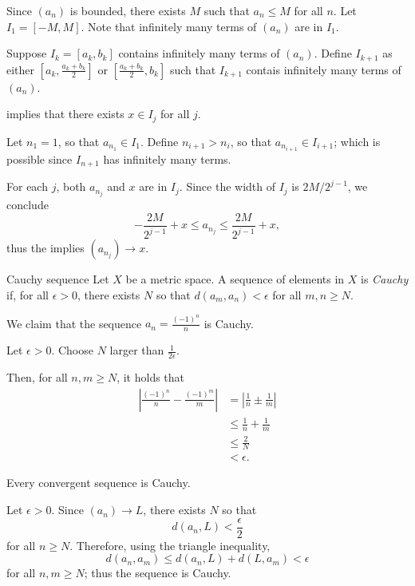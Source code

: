 \begin{dem}{}{}
	Since \((a_n)\) is bounded, there exists \(M\) such that \(a_n \leq M\) for all \(n\). Let \(I_1 = [-M, M]\). Note that infinitely many terms of \((a_n)\) are in \(I_1\).

	Suppose \(I_k = [a_k, b_k]\) contains infinitely many terms of \((a_n)\). Define \(I_{k+1}\) as either \([a_k, \frac{a_k + b_k}{2}]\) or  \([\frac{a_k+b_k}{2}, b_k]\) such that \(I_{k+1}\) contais infinitely many terms of \((a_n)\).

	 implies that there exists \(x \in I_j\) for all \(j\).

	Let \(n_1 = 1\), so that \(a_{n_1} \in I_1\). Define \(n_{i+1} > n_i\), so that \(a_{n_{i+1}} \in I_{i+1}\); which is possible since \(I_{n+1}\) has infinitely many terms.

	For each \(j\), both \(a_{n_j}\) and \(x\) are in \(I_j\). Since the width of \(I_j\) is \(2M/2^{j-1}\), we conclude  \[
		-\frac{2M}{2^{j-1}} + x \leq a_{n_j}  \leq \frac{2M}{2^{j-1}} + x,
	\]
	thus the  implies \((a_{n_j}) \to x\).
\end{dem}

\begin{defn}{Cauchy sequence}{}	
	Let \(X\) be a metric space. 
	A sequence of elements in \(X\) is \emph{Cauchy} if, for all \(\epsilon > 0\), there exists \(N\) so that \(d(a_m, a_n) < \epsilon\) for all \(m, n \geq N\).
\end{defn}

\begin{exmp}{}{}
	We claim that the sequence \(a_n = \frac{(-1)^n}{n}\) is Cauchy.

	Let \(\epsilon > 0\). Choose \(N\) larger than \(\frac{1}{2\epsilon}\).

	Then, for all \(n, m \geq N\), it holds that
	\begin{align*}
		\left|\frac{(-1)^n}{n} - \frac{(-1)^m}{m}\right| &= \left|\frac{1}{n} \pm \frac{1}{m}\right| \\
		&\leq \frac{1}{n} + \frac{1}{m} \\
		&\leq \frac{2}{N} \\
		&< \epsilon.
	\end{align*}
\end{exmp}

\begin{prop}{}{}
	Every convergent sequence is Cauchy.
\end{prop}

\begin{dem}{}{}
	Let \(\epsilon > 0\). Since \((a_n) \to L\), there exists \(N\) so that  \[
		d(a_n, L) < \frac{\epsilon}{2}
	\]
	for all \(n \geq N\). Therefore, using the triangle inequality, \[
		d(a_n, a_m) \leq d(a_n, L) + d(L, a_m) < \epsilon
	\]
	for all \(n, m \geq N\); thus the sequence is Cauchy.
\end{dem}
